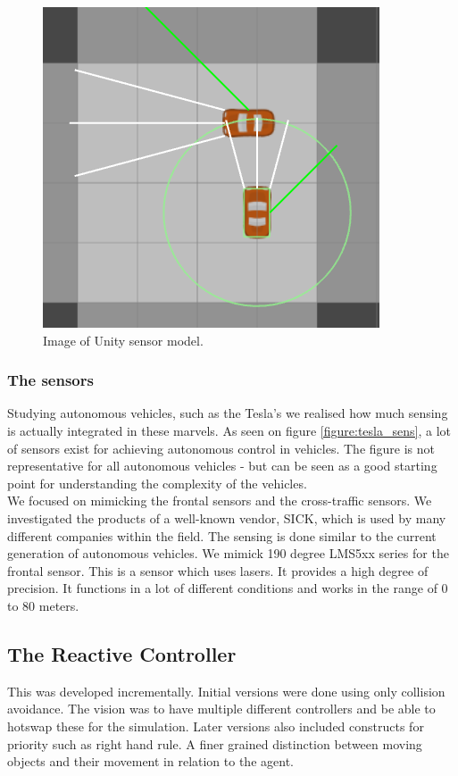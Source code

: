 \begin{figure}
\centering
\includegraphics[scale=.5]{img/sensors}
\caption{Image of Unity sensor model.}
\label{figure:unity_sens}
\end{figure}

\subsubsection{The sensors}
Studying autonomous vehicles, such as the Tesla's we realised how much sensing is actually integrated in these marvels.
As seen on figure \ref{figure:tesla_sens}, a lot of sensors exist for achieving autonomous control in vehicles.
The figure is not representative for all autonomous vehicles - but can be seen as a good starting point for understanding the complexity of the vehicles.\\

We focused on mimicking the frontal sensors and the cross-traffic sensors.
We investigated the products of a well-known vendor, SICK, which is used by many different companies within the field.
The sensing is done similar to the current generation of autonomous vehicles. We mimick 190 degree LMS5xx series for the frontal sensor. This is a sensor which uses lasers. It provides a high degree of precision. It functions in a lot of different conditions and works in the range of 0 to 80 meters.



\subsection{The Reactive Controller}
This was developed incrementally. Initial versions were done using only collision avoidance.
The vision was to have multiple different controllers and be able to hotswap these for the simulation.
Later versions also included constructs for priority such as right hand rule. A finer grained distinction between moving objects and their movement in relation to the agent.

